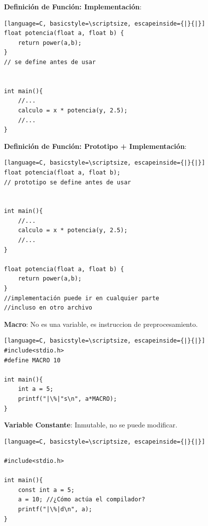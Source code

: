 \documentclass{article}
\begin{document}
\begin{itemize}

\begin{minipage}[h]{0.45\textwidth}
\item \textbf{Definición de Función: Implementación}:
\begin{lstlisting}[language=C, basicstyle=\scriptsize, escapeinside={|}{|}]
float potencia(float a, float b) { 
	return power(a,b);
}
// se define antes de usar


int main(){
	//...
	calculo = x * potencia(y, 2.5);
	//...
}
\end{lstlisting}
\end{minipage}
\hspace{0.5cm}
\begin{minipage}[h]{0.45\textwidth}
\item \textbf{Definición de Función: Prototipo + Implementación}:
\begin{lstlisting}[language=C, basicstyle=\scriptsize, escapeinside={|}{|}]
float potencia(float a, float b);
// prototipo se define antes de usar


int main(){
	//...
	calculo = x * potencia(y, 2.5);
	//...
}

float potencia(float a, float b) { 
	return power(a,b);
}
//implementación puede ir en cualquier parte
//incluso en otro archivo
\end{lstlisting}
\end{minipage}

\begin{minipage}[h]{0.45\textwidth}
\item \textbf{Macro}: No es una variable, es instruccion de preprocesamiento.
\begin{lstlisting}[language=C, basicstyle=\scriptsize, escapeinside={|}{|}]
#include<stdio.h>
#define MACRO 10 

int main(){
	int a = 5;
	printf("|\%|"s\n", a*MACRO);
}
\end{lstlisting}
\end{minipage}
\hspace{0.5cm}
\begin{minipage}[h]{0.45\textwidth}
\item \textbf{Variable Constante}: Inmutable, no se puede modificar.
\begin{lstlisting}[language=C, basicstyle=\scriptsize, escapeinside={|}{|}]

#include<stdio.h>

int main(){
	const int a = 5;
	a = 10; //¿Cómo actúa el compilador?
	printf("|\%|d\n", a);
}
\end{lstlisting}
\end{minipage}


\end{itemize}
\end{document}
